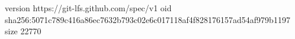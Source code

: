 version https://git-lfs.github.com/spec/v1
oid sha256:5071c789c416a86ec7632b793c02e6c017118af4f828176157ad54af979b1197
size 22770
